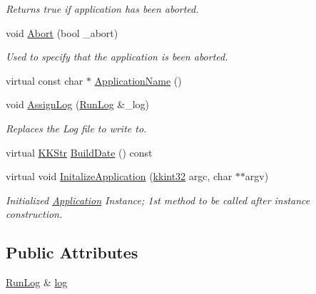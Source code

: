 \begin{DoxyCompactItemize}
\begin{DoxyCompactList}\small\item\em Returns \textquotesingle{}true\textquotesingle{} if application has been aborted. \end{DoxyCompactList}\item 
void \hyperlink{class_k_k_b_1_1_application_adebf960886311c38ed4bced73649c99f}{Abort} (bool \+\_\+abort)
\begin{DoxyCompactList}\small\item\em Used to specify that the application is been aborted. \end{DoxyCompactList}\item 
virtual const char $\ast$ \hyperlink{class_k_k_b_1_1_application_aab5821a00f30e26a0806856c4e2e569e}{Application\+Name} ()
\item 
void \hyperlink{class_k_k_b_1_1_application_afae918106bf74e5fd8d80310a6614742}{Assign\+Log} (\hyperlink{class_k_k_b_1_1_run_log}{Run\+Log} \&\+\_\+log)
\begin{DoxyCompactList}\small\item\em Replaces the Log file to write to. \end{DoxyCompactList}\item 
virtual \hyperlink{class_k_k_b_1_1_k_k_str}{K\+K\+Str} \hyperlink{class_k_k_b_1_1_application_a27db46f806e5eb984ce37e593dbeef1a}{Build\+Date} () const 
\item 
virtual void \hyperlink{class_k_k_b_1_1_application_a426afb84e2065aebb8abefc32217a770}{Initalize\+Application} (\hyperlink{namespace_k_k_b_a8fa4952cc84fda1de4bec1fbdd8d5b1b}{kkint32} argc, char $\ast$$\ast$argv)
\begin{DoxyCompactList}\small\item\em Initialized \hyperlink{class_k_k_b_1_1_application}{Application} Instance; 1st method to be called after instance construction. \end{DoxyCompactList}\end{DoxyCompactItemize}
\subsection*{Public Attributes}
\begin{DoxyCompactItemize}
\item 
\hyperlink{class_k_k_b_1_1_run_log}{Run\+Log} \& \hyperlink{class_k_k_b_1_1_application_aa43b9ff197029ea41b52d21d50f48a1e}{log}
\end{DoxyCompactItemize}
